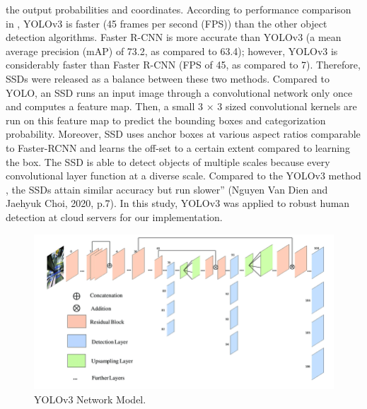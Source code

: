the output probabilities and coordinates. According to performance comparison in \cite{redmon2018yolov3}, YOLOv3 is faster (45 frames per second (FPS)) than the other object detection algorithms. Faster R-CNN is more accurate than YOLOv3 (a mean average precision (mAP) of 73.2, as compared to 63.4); however, YOLOv3 is considerably faster than Faster R-CNN (FPS of 45, as compared to 7). Therefore, SSDs  \cite{liu2016ssd} were released as a balance between these two methods. Compared to YOLO, an SSD runs an input image through a convolutional network only once and computes a feature map. Then, a small 3 × 3 sized convolutional kernels are run on this feature map to predict the bounding boxes and categorization probability. Moreover, SSD uses anchor boxes at various aspect ratios comparable to Faster-RCNN and learns the off-set to a certain extent compared to learning the box. The SSD is able to detect objects of multiple scales because every convolutional layer function at a diverse scale. Compared to the YOLOv3 method \cite{redmon2018yolov3}, the SSDs attain similar accuracy but run slower” (Nguyen Van Dien and Jaehyuk Choi, 2020, p.7). In this study, YOLOv3 was applied to robust human detection at cloud servers for our implementation. 

\begin{figure}
\centering
 \includegraphics[width=1.0\linewidth]{Figures/yolov3.png}
 \caption{YOLOv3 Network Model.}
 \label{fig:yolov3}
\end{figure}
